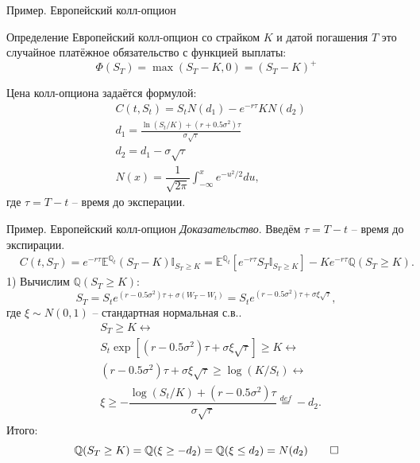 \documentclass[aspectratio=169]{beamer}
\begin{document}
\begin{frame}{Пример. Европейский колл-опцион}
    \begin{block}{Определение}
        Европейский колл-опцион со страйком $K$ и датой погашения $T$ это случайное платёжное обязательство с функцией выплаты:
        $$\Phi(S_T) = \max(S_T-K, 0) = (S_T - K)^+$$
    \end{block}

    \pause
    Цена колл-опциона задаётся формулой:
    \begin{align*}
        &C(t, S_t) = S_t N(d_1) - e^{-r\tau}K N(d_2) \\
        &d_1 = \frac{\ln(S_t/K) + (r+0.5\sigma^2)\tau}{\sigma \sqrt{\tau}}\\
        &d_2 = d_1 - \sigma \sqrt{\tau}\\
        & N(x) = \dfrac{1}{\sqrt{2\pi}}\int_{-\infty}^x e^{-u^2/2}du,
    \end{align*}где $\tau=T-t$ -- время до эксперации.
\end{frame}

\begin{frame}{Пример. Европейский колл-опцион}
    \textit{Доказательство}. Введём $\tau = T - t$ -- время до экспирации.
    \begin{align*}
        &C(t, S_T) = e^{-r\tau}\mathbb{E}^{\mathbb{Q}_t}(S_T - K) \mathbb{I}_{S_T \geq K} 
        = \mathbb{E}^{\mathbb{Q}_t}\left[e^{-r\tau} S_T \mathbb{I}_{S_T \geq K}\right] - K e^{-r\tau} \mathbb{Q}(S_T \geq K).
    \end{align*}
    1) Вычислим $\mathbb{Q}(S_T \geq K)$:
        $$
            S_T = S_t e^{(r-0.5 \sigma^2)\tau + \sigma (W_T - W_t)} = S_t e^{(r-0.5 \sigma^2)\tau + \sigma \xi \sqrt{\tau}},
        $$где $\xi \sim N(0, 1)$ -- стандартная нормальная с.в.. 
        \begin{align*}
            &S_T \geq K \longleftrightarrow \\
            &S_t \exp \left[ (r-0.5\sigma^2)\tau + \sigma \xi \sqrt{\tau}\right] \geq K \longleftrightarrow \\
            &  (r-0.5\sigma^2)\tau + \sigma \xi \sqrt{\tau} \geq \log(K / S_t) \longleftrightarrow \\ 
            & \xi \geq - \dfrac{\log(S_t/K) + (r-0.5\sigma^2)\tau}{\sigma \sqrt{\tau}} \overset{def}{=} -d_2.
        \end{align*}
        Итого:
        $$
            \mathbb{Q}(S_T \geq K) = \mathbb{Q}(\xi \geq -d_2) = \mathbb{Q}(\xi \leq d_2) = N(d_2) \qed
        $$
\end{frame}
\end{document}
